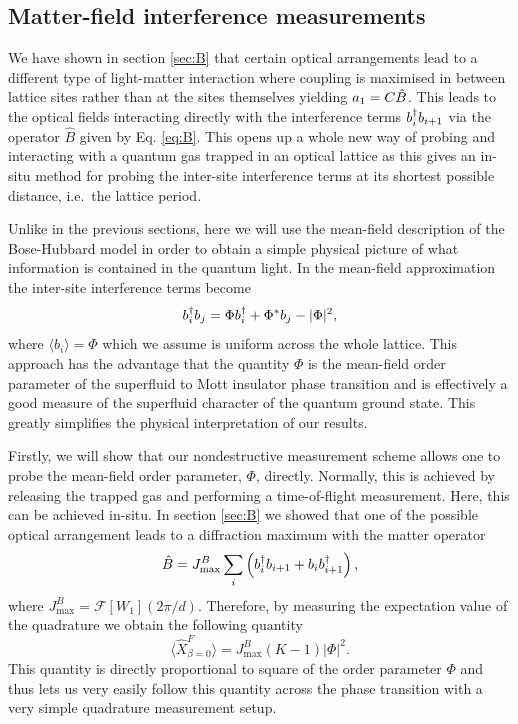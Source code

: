 \subsection{Matter-field interference measurements}

We have shown in section \ref{sec:B} that certain optical arrangements
lead to a different type of light-matter interaction where coupling is
maximised in between lattice sites rather than at the sites themselves
yielding $a_1 = C\hat{B}$. This leads to the optical fields
interacting directly with the interference terms $b^\dagger_i b_{i+1}$ via
the operator $\hat{B}$ given by Eq. \eqref{eq:B}. This opens up a
whole new way of probing and interacting with a quantum gas trapped in
an optical lattice as this gives an in-situ method for probing the
inter-site interference terms at its shortest possible distance,
i.e.~the lattice period.


Unlike in the previous sections, here we will use the mean-field
description of the Bose-Hubbard model in order to obtain a simple
physical picture of what information is contained in the quantum
light. In the mean-field approximation the inter-site interference
terms become
\begin{equation}
  b^\dagger_i b_j = \Phi b^\dagger_i + \Phi^* b_j - |\Phi|^2,
\end{equation}
where $\langle b_i \rangle = \Phi$ which we assume is uniform across
the whole lattice. This approach has the advantage that the quantity
$\Phi$ is the mean-field order parameter of the superfluid to Mott
insulator phase transition and is effectively a good measure of the
superfluid character of the quantum ground state. This greatly
simplifies the physical interpretation of our results.

Firstly, we will show that our nondestructive measurement scheme
allows one to probe the mean-field order parameter, $\Phi$,
directly. Normally, this is achieved by releasing the trapped gas and
performing a time-of-flight measurement. Here, this can be achieved
in-situ. In section \ref{sec:B} we showed that one of the possible
optical arrangement leads to a diffraction maximum with the matter
operator
\begin{equation}
  \label{eq:Bmax}
  \hat{B} = J^B_\mathrm{max} \sum_i \left( b^\dagger_i b_{i+1} + b_i b^\dagger_{i+1} \right),
\end{equation}
where $J^B_\mathrm{max} = \mathcal{F}[W_1](2\pi/d)$. Therefore, by measuring the
expectation value of the quadrature we obtain the following quantity
\begin{equation}
  \langle \hat{X}^F_{\beta=0} \rangle = J^B_\mathrm{max} (K-1) | \Phi |^2 .
\end{equation}
This quantity is directly proportional to square of the order
parameter $\Phi$ and thus lets us very easily follow this quantity
across the phase transition with a very simple quadrature measurement
setup. 

